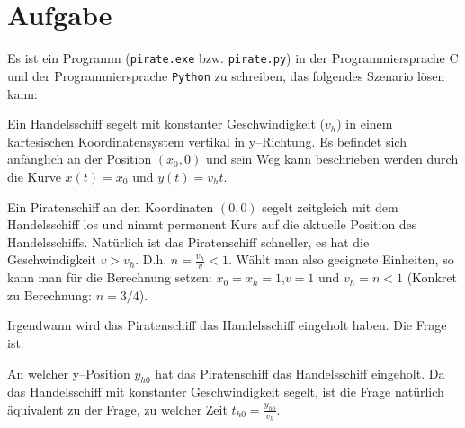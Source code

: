 \documentclass[paper=a4,notitlepage,parskip=half,plainheadsepline]{scrartcl}
\newif\ifloesung
\begin{document}
        \begin{tcolorbox}[toptitle=3mm,bottomtitle=3mm,title=\centering{{\lf J}\hfil Ausbildung Fachinformatiker Anwendungsentwicklung\hfil {\lf J}},
          drop lifted shadow=gray]
        \centering{\vspace{0.5cm}\LARGE Programmierübung %
        \ifloesung (mit Musterlösung)\fi}\\[0.3cm]
        \\\vspace{0.5cm}
        \end{tcolorbox}

\section{Aufgabe}
Es ist ein Programm (\texttt{pirate.exe} bzw. \texttt{pirate.py}) in der Programmiersprache C und der Programmiersprache \texttt{Python} zu schreiben, das folgendes Szenario lösen kann:

Ein Handelsschiff segelt mit konstanter Geschwindigkeit ($v_h$) in einem kartesischen Koordinatensystem vertikal in y--Richtung. Es befindet sich anfänglich an der Position $(x_0,0)$ und sein Weg kann beschrieben werden durch die Kurve $x(t) = x_0$ und $y(t) = v_h t$.

Ein Piratenschiff an den Koordinaten $(0,0)$ segelt zeitgleich mit dem Handelsschiff los und nimmt permanent Kurs auf die aktuelle Position des Handelsschiffs. Natürlich ist das Piratenschiff schneller, es hat die Geschwindigkeit $v >v_h$. D.h. $n = \frac{v_h}{v} < 1$. Wählt man also geeignete Einheiten, so kann man für die Berechnung setzen:
$x_0=x_h=1$,$v = 1$ und $v_h = n < 1$ (Konkret zu Berechnung: $n=3/4$).

Irgendwann wird das Piratenschiff das Handelsschiff eingeholt haben. Die Frage ist:

An welcher y--Position $y_{h0}$ hat das Piratenschiff das Handelsschiff eingeholt.
Da das Handelsschiff mit konstanter Geschwindigkeit segelt, ist die Frage natürlich äquivalent zu der Frage, zu welcher Zeit $t_{h0} = \frac{y_{h0}}{v_{h}}$.

  
\end{document}
